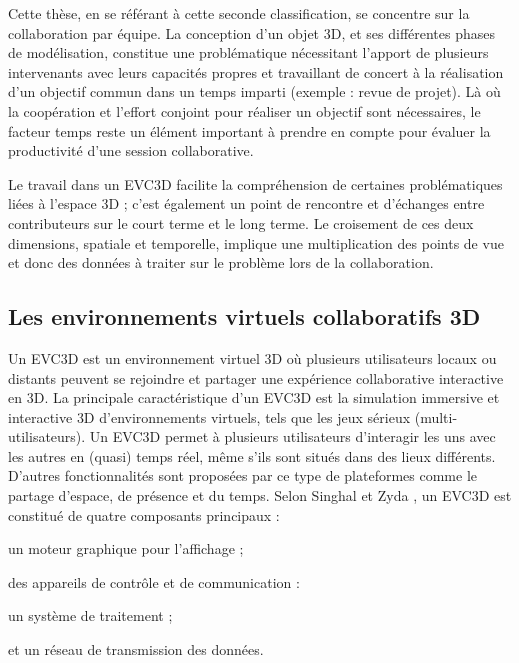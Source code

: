 Cette thèse, en se référant à cette seconde classification, se concentre sur la 
collaboration par équipe. La conception d'un objet \gls{3D}, et ses différentes 
phases de modélisation, constitue une problématique nécessitant l'apport de 
plusieurs intervenants avec leurs capacités propres et travaillant de concert à la 
réalisation d'un objectif commun dans un temps imparti (exemple : revue de 
projet). Là où la coopération et l'effort conjoint pour réaliser un objectif sont 
nécessaires, le facteur temps reste un élément important à prendre en compte 
pour évaluer la productivité d'une session collaborative.

Le travail dans un \gls{EVC3D} facilite la compréhension 
de certaines problématiques liées à l'espace \gls{3D} ; c'est également un point de 
rencontre et d'échanges entre contributeurs sur le court terme et le long terme. 
Le croisement de ces deux dimensions, spatiale et temporelle, implique une 
multiplication des points de vue et donc des données à traiter sur le problème lors 
de la collaboration.


\subsection{Les environnements virtuels collaboratifs 3D}

Un \gls{EVC3D} est un environnement virtuel \gls{3D} où plusieurs utilisateurs 
locaux ou distants peuvent se rejoindre et partager une expérience collaborative 
interactive en \gls{3D}. La principale caractéristique d'un \gls{EVC3D} est la 
simulation 
immersive et interactive \gls{3D} d'environnements virtuels, tels que les jeux 
sérieux (multi-utilisateurs). Un \gls{EVC3D} permet à plusieurs utilisateurs 
d'interagir les uns avec les autres en (quasi) temps réel, même s'ils sont 
situés dans des lieux différents. 
D'autres fonctionnalités sont proposées par ce type de plateformes comme le 
partage d'espace, de présence et du temps. Selon Singhal et Zyda 
\cite{Singhal1999}, un \gls{EVC3D} est constitué de quatre composants principaux :
\begin{enumerate*}[label=(\roman*)]
	\item un moteur graphique pour l'affichage ;
	\item des appareils de contrôle et de communication :
	\item un système de traitement ;
	\item et un réseau de transmission des données. 
\end{enumerate*}

